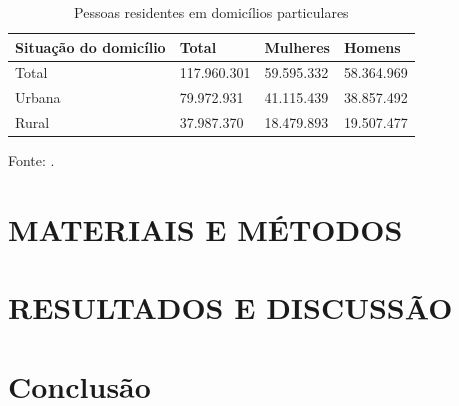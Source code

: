 \documentclass{UNESC}
\begin{document}
\begin{table}[h!]
\begin{center}
\caption{Pessoas residentes em domicílios particulares}
\vspace{-0.2cm} 
    \begin{center}
    \label{tab:table1}
    \begin{tabular}{l l l l} 
    \hline
    Situação do domicílio & Total & Mulheres & Homens \\
    \hline
    Total   & 117.960.301 & 59.595.332 & 58.364.969 \\
    Urbana  & 79.972.931  & 41.115.439 & 38.857.492 \\
    Rural   & 37.987.370  & 18.479.893 & 19.507.477 \\
    \hline
    \end{tabular} 
  \end{center}
\end{center}  
\vspace{-0.2cm}
\hspace{1cm}\footnotesize Fonte: .
\end{table}

\section{MATERIAIS E MÉTODOS}

\section{RESULTADOS E DISCUSSÃO}


\section{Conclusão}


\renewcommand{\refname}{REFERÊNCIAS}

%
%
\end{document}
